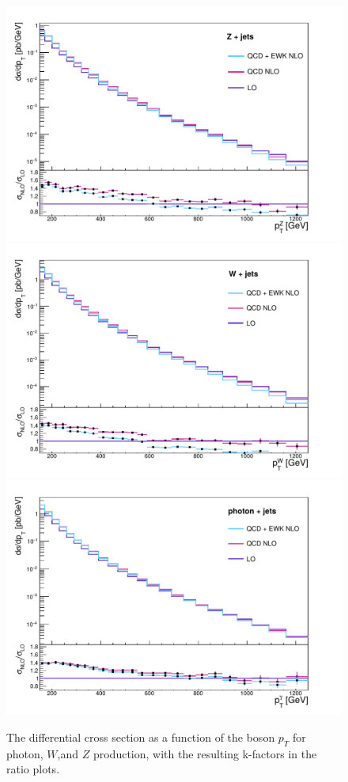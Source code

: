 \begin{figure}[ht]
  \centering
 \includegraphics[width=.49\textwidth]{Z_EWK_kfactor.pdf} 
 \includegraphics[width=.49\textwidth]{W_EWK_kfactor.pdf} \\
 \includegraphics[width=.49\textwidth]{gamma_EWK_kfactor.pdf} 
 \caption{ The differential cross section as a function of the boson $p_T$ for photon, $W$,and $Z$ production, with the resulting k-factors in the ratio plots.}
 \label{fig:kfactors}
\end{figure}

